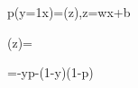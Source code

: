p(y=1\mid\mathbf x)=\sigma(z),\qquad z=\mathbf w\cdot\mathbf x+b

\sigma(z)=

\ell=-y\ln p-(1-y)\ln(1-p)
